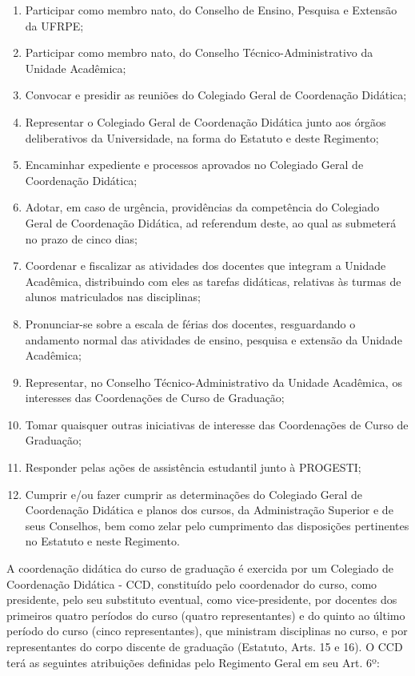 \documentclass[
	12pt,				%
	openright,			%
  oneside,     %
	a4paper,			%
 hyphens,
	chapter=TITLE,		%
	english,			%
	french,				%
	spanish,			%
	brazil				%
	]{abntex2}
\begin{document}
\begin{enumerate}
    \item Participar como membro nato, do Conselho de Ensino, Pesquisa e Extensão da UFRPE;
    \item Participar como membro nato, do Conselho Técnico-Administrativo da Unidade 	Acadêmica;
    \item Convocar e presidir as reuniões do Colegiado Geral de Coordenação Didática;
    \item Representar o Colegiado Geral de Coordenação Didática junto aos órgãos 	deliberativos da Universidade, na forma do Estatuto e deste Regimento;
    \item Encaminhar expediente e processos aprovados no Colegiado Geral de Coordenação Didática;
    \item Adotar, em caso de urgência, providências da competência do Colegiado Geral de Coordenação Didática, ad referendum deste, ao qual as submeterá no prazo de cinco dias;
    \item Coordenar e fiscalizar as atividades dos docentes que integram a Unidade Acadêmica, distribuindo com eles as tarefas didáticas, relativas 	às turmas de alunos matriculados nas disciplinas;
    \item Pronunciar-se 	sobre a escala de férias dos docentes, resguardando o andamento normal das atividades de ensino, pesquisa e extensão da Unidade Acadêmica;
    \item Representar, no Conselho Técnico-Administrativo da Unidade Acadêmica, os  interesses das Coordenações de Curso de Graduação;
    \item Tomar quaisquer outras iniciativas de interesse das Coordenações de Curso de Graduação;
    \item Responder pelas ações de assistência estudantil junto à PROGESTI;
    \item Cumprir e/ou fazer cumprir as determinações do Colegiado Geral de Coordenação Didática e planos dos cursos, da Administração Superior e de seus Conselhos, bem como zelar pelo cumprimento das disposições pertinentes no Estatuto e neste Regimento.
\end{enumerate}

A coordenação didática do curso de graduação é exercida por um Colegiado de Coordenação Didática - CCD, constituído pelo coordenador do curso, como presidente, pelo seu substituto eventual, como vice-presidente, por docentes dos primeiros quatro períodos do curso (quatro representantes) e do quinto ao último período do curso (cinco representantes), que ministram disciplinas no curso, e por representantes do corpo discente de graduação (Estatuto, Arts. 15 e 16). O CCD terá as seguintes atribuições definidas pelo Regimento Geral em seu Art. 6º:
\end{document}
